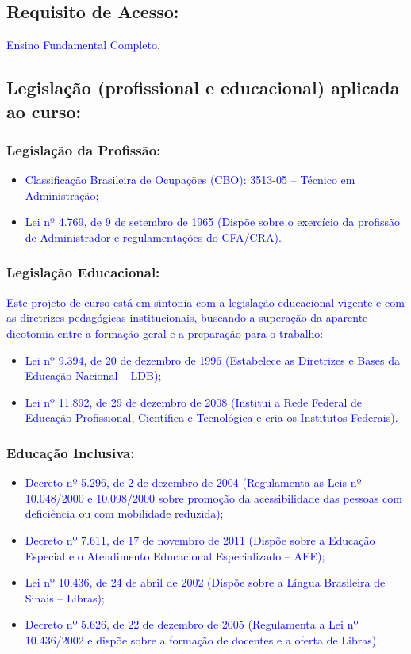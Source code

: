 \documentclass{../../modelos/latex-shared/ifsc-ppc}
\newcommand{\revisao}[1]{\textcolor{blue}{#1}}
\newcommand{\revisao}[1]{#1}
\newcommand{\semsumario}[1]{\addtocontents{toc}{\protect\setcounter{tocdepth}{2}}#1\addtocontents{toc}{\protect\setcounter{tocdepth}{4}}}
\begin{document}
\subsection{Requisito de Acesso:}
\revisao{Ensino Fundamental Completo.}

\subsection{Legislação (profissional e educacional) aplicada ao curso:}

\semsumario{\subsubsection{Legislação da Profissão:}}
\begin{itemize}
    \item \revisao{Classificação Brasileira de Ocupações (CBO): 3513-05 -- Técnico em Administração;}
    \item \revisao{Lei nº 4.769, de 9 de setembro de 1965 (Dispõe sobre o exercício da profissão de Administrador e regulamentações do CFA/CRA).}
\end{itemize}

\semsumario{\subsubsection{Legislação Educacional:}}
\revisao{Este projeto de curso está em sintonia com a legislação educacional vigente e com as diretrizes pedagógicas institucionais, buscando a superação da aparente dicotomia entre a formação geral e a preparação para o trabalho:}
\begin{itemize}
    \item \revisao{Lei nº 9.394, de 20 de dezembro de 1996 (Estabelece as Diretrizes e Bases da Educação Nacional -- LDB);}
    \item \revisao{Lei nº 11.892, de 29 de dezembro de 2008 (Institui a Rede Federal de Educação Profissional, Científica e Tecnológica e cria os Institutos Federais).}
\end{itemize}

\semsumario{\subsubsection{Educação Inclusiva:}}
\begin{itemize}
    \item \revisao{Decreto nº 5.296, de 2 de dezembro de 2004 (Regulamenta as Leis nº 10.048/2000 e 10.098/2000 sobre promoção da acessibilidade das pessoas com deficiência ou com mobilidade reduzida);}
    \item \revisao{Decreto nº 7.611, de 17 de novembro de 2011 (Dispõe sobre a Educação Especial e o Atendimento Educacional Especializado -- AEE);}
    \item \revisao{Lei nº 10.436, de 24 de abril de 2002 (Dispõe sobre a Língua Brasileira de Sinais -- Libras);}
    \item \revisao{Decreto nº 5.626, de 22 de dezembro de 2005 (Regulamenta a Lei nº 10.436/2002 e dispõe sobre a formação de docentes e a oferta de Libras).}
\end{itemize}
\end{document}
